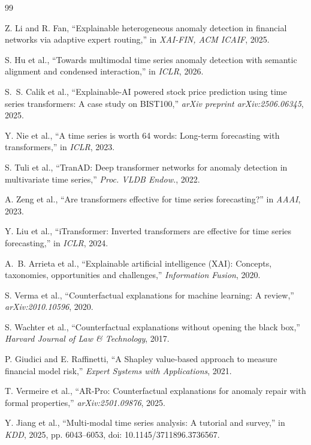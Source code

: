 \documentclass[11pt,a4paper,twoside]{article}
\begin{document}
\begin{thebibliography}{99}
\setlength{\itemsep}{0pt}

Z. Li and R. Fan,
``Explainable heterogeneous anomaly detection in financial networks via adaptive expert routing,''
in \emph{XAI-FIN, ACM ICAIF}, 2025.

S. Hu et al.,
``Towards multimodal time series anomaly detection with semantic alignment and condensed interaction,''
in \emph{ICLR}, 2026.

S.~S. Calik et al.,
``Explainable-AI powered stock price prediction using time series transformers: A case study on BIST100,''
\emph{arXiv preprint arXiv:2506.06345}, 2025.

Y. Nie et al.,
``A time series is worth 64 words: Long-term forecasting with transformers,''
in \emph{ICLR}, 2023.

S. Tuli et al.,
``TranAD: Deep transformer networks for anomaly detection in multivariate time series,''
\emph{Proc. VLDB Endow.}, 2022.

A. Zeng et al.,
``Are transformers effective for time series forecasting?''
in \emph{AAAI}, 2023.

Y. Liu et al.,
``iTransformer: Inverted transformers are effective for time series forecasting,''
in \emph{ICLR}, 2024.

A.~B. Arrieta et al.,
``Explainable artificial intelligence (XAI): Concepts, taxonomies, opportunities and challenges,''
\emph{Information Fusion}, 2020.

S. Verma et al.,
``Counterfactual explanations for machine learning: A review,''
\emph{arXiv:2010.10596}, 2020.

S. Wachter et al.,
``Counterfactual explanations without opening the black box,''
\emph{Harvard Journal of Law \& Technology}, 2017.

P. Giudici and E. Raffinetti,
``A Shapley value-based approach to measure financial model risk,''
\emph{Expert Systems with Applications}, 2021.

T. Vermeire et al.,
``AR-Pro: Counterfactual explanations for anomaly repair with formal properties,''
\emph{arXiv:2501.09876}, 2025.

Y. Jiang et al.,
``Multi-modal time series analysis: A tutorial and survey,''
in \emph{KDD}, 2025, pp. 6043--6053, doi: 10.1145/3711896.3736567.


\end{thebibliography}
\end{document}
